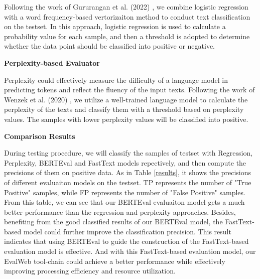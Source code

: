 \documentclass{article}
\begin{document}
 Following the work of Gururangan et al. (2022) \cite{gururangan_whose_2022}, we combine logistic regression with a word frequency-based vertorizaiton method to conduct text classification on the testset. In this approach, logistic regression is used to calculate a probability value for each sample, and then a threshold is adopted to determine whether the data point should be classified into positive or negative. 
 

 
 \textbf{Perplexity-based Evaluator}
 
 Perplexity could effectively measure the difficulty of a language model in predicting tokens and reflect the fluency of the input texts. Following the work of Wenzek et al. (2020) \cite{wenzek_ccnet_2020}, we utilize a well-trained language model to calculate the perplexity of the texts and classify them with a threshold based on perplexity values. The samples with lower perplexity values will be classified into positive.
 
 \textbf{Comparison Results}
 
 During testing procedure, we will classify the samples of testset with Regression, Perplexity, BERTEval and FastText models repectively, and then compute the precisions of them on positive data. As in Table \ref{results}, it shows the precisions of different evaluaiton models on the testset. TP represents the number of "True Positive" samples, while FP represents the number of "False Positive" samples. From this table, we can see that our BERTEval evaluaiton model gets a much better performance than the regression and perplexity approaches. Besides, benefiting from the good classified results of our BERTEval model, the FastText-based model could further improve the classification precision. This result indicates that using BERTEval to guide the construction of the FastText-based evaluation model is effective. And with this FastText-based evaluation model, our EvalWeb tool-chain could achieve a better performance while effectively improving processing efficiency and resource utilization.

\end{document}
